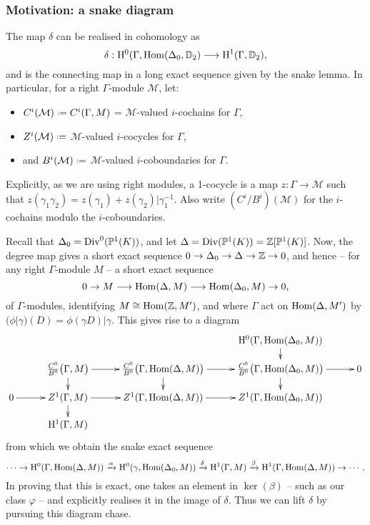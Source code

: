 \documentclass[a4paper,11pt]{article}
\numberwithin{equation}{section}
\begin{document}
\subsubsection{Motivation: a snake diagram}
The map $\delta$ can be realised in cohomology as 
\[
\delta : \mathrm{H}^0(\Gamma,\mathrm{Hom}(\Delta_0,\mathbb{D}_2) \longrightarrow \mathrm{H}^1(\Gamma,\mathbb{D}_2),
\]
and is the connecting map in a long exact sequence given by the snake lemma. In particular, for a right $\Gamma$-module $\mathcal{M}$, let:
\begin{itemize}
	\item $C^i(\mathcal{M}) \defeq C^i(\Gamma,M)$ = $\mathcal{M}$-valued $i$-cochains for $\Gamma$,
	\item $Z^i(\mathcal{M}) \defeq$ $\mathcal{M}$-valued $i$-cocycles for $\Gamma$,
	\item and $B^i(\mathcal{M}) \defeq$ $\mathcal{M}$-valued $i$-coboundaries for $\Gamma$. 
\end{itemize}
Explicitly, as we are using right modules, a 1-cocycle is a map $z : \Gamma \to \mathcal{M}$ such that $z(\gamma_1\gamma_2) = z(\gamma_1) + z(\gamma_2)|\gamma_1^{-1}$. Also write $(C^i/B^i)(\mathcal{M})$ for the $i$-cochains modulo the $i$-coboundaries.

Recall that $\Delta_0 = \mathrm{Div}^0(\mathbb{P}^1(K))$, and let $\Delta = \mathrm{Div}(\mathbb{P}^1(K)) = \mathbb{Z}[\mathbb{P}^1(K)]$. Now, the degree map gives a short exact sequence $0 \to \Delta_0 \to \Delta \to \mathbb{Z} \to 0$, and hence -- for any right $\Gamma$-module $M$ -- a short exact sequence
\[
	0 \to M \longrightarrow \mathrm{Hom}(\Delta,M) \longrightarrow \mathrm{Hom}(\Delta_0,M) \to 0,
\]
of $\Gamma$-modules, identifying $M \cong \mathrm{Hom}(\mathbb{Z},M')$, and where $\Gamma$ act on $\mathrm{Hom}(\Delta,M')$ by $(\phi|\gamma)(D) = \phi(\gamma D)|\gamma$. This gives rise to a diagram
\[
	\xymatrix@C=10mm@R=4mm{
		& & & \h^0(\Gamma,\Hom(\Delta_0,M))\ar[d] &\\
			 & \frac{C^0}{B^0}\big(\Gamma,M\big)\ar[r]\ar[d]   & \frac{C^0}{B^0}\big(\Gamma,\Hom(\Delta,M)\big)\ar[r]\ar[d] &  \frac{C^0}{B^0}\big(\Gamma,\Hom(\Delta_0,M)\big)\ar[r]\ar[d] &0\\
	0 \ar[r]  & Z^1(\Gamma,M)  \ar[r]\ar[d] & Z^1(\Gamma,\Hom(\Delta,M))  \ar[r] & Z^1(\Gamma,\Hom(\Delta_0,M)) &\\
	& \h^1(\Gamma,M) & & & \\
}
\]
from which we obtain the snake exact sequence
\[
\cdots \to \mathrm{H}^0(\Gamma,\mathrm{Hom}(\Delta,M)) \xrightarrow{\alpha} \mathrm{H}^0(\gamma,\mathrm{Hom}(\Delta_0,M)) \xrightarrow{\delta} \mathrm{H}^1(\Gamma,M) \xrightarrow{\beta} \mathrm{H}^1(\Gamma,\mathrm{Hom}(\Delta,M)) \to \cdots.
\]
In proving that this is exact, one takes an element in $\ker(\beta)$ -- such as our class $\varphi$ -- and explicitly realises it in the image of $\delta$. Thus we can lift $\delta$ by pursuing this diagram chase.
\end{document}
